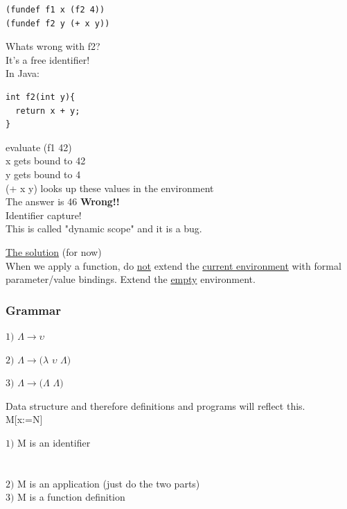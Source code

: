 \documentclass{article}
\newcommand\tab[1][1cm]{\hspace*{#1}}
\begin{document}
\begin{flushleft}
\begin{verbatim}
(fundef f1 x (f2 4))
(fundef f2 y (+ x y))
\end{verbatim}
Whats wrong with f2?\\
It's a free identifier!\\
In Java:
\begin{verbatim}
int f2(int y){
  return x + y;
}
\end{verbatim}
evaluate (f1 42)\\
 x gets bound to 42\\
 y gets bound to 4\\
 (+ x y) looks up these values in the environment\\
 The answer is 46 \textbf{Wrong!!}\\
\bigskip
Identifier capture!\\
This is called "dynamic scope" and it is a bug.
\bigskip
\begin{flushleft}
\underline{The solution} (for now)\\
When we apply a function, do \underline{not} extend the \underline{current environment} with formal parameter/value bindings. Extend the \underline{empty} environment.
\end{flushleft}

\subsubsection*{Grammar}
\begin{flushleft}
$1)$ $\Lambda\rightarrow\upsilon$

$2)$ $\Lambda\rightarrow(\lambda$ 
$\upsilon$
$\Lambda)$

$3)$ $\Lambda\rightarrow(\Lambda$
$\Lambda)$

Data structure and therefore definitions and programs will reflect this.\\
\bigskip
M[x:=N]\\
\end{flushleft}

\begin{flushleft}
$1)$ M is an identifier\\
\tab{a) M=x $\Rightarrow$ M[x	:=N] is N}\\
\tab{b) M$\neq$x $\Rightarrow$ M[x:=N] is M}\\
\bigskip
$2)$ M is an application (just do the two parts)\\
\bigskip
$3)$ M is a function definition\\
\tab{Case (a) is easy $\lambda$yM1, y=x}\\
\tab{Case (b) is hard $\lambda$yM1, y$\neq$x}\\
\end{flushleft}


\end{flushleft}
\end{document}
